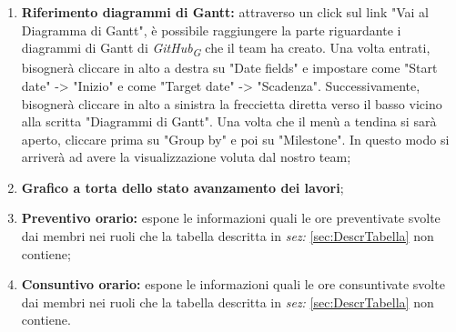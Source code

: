 \begin{enumerate}
    \item \textbf{Riferimento diagrammi di Gantt:} attraverso un click sul link "Vai al Diagramma di Gantt", è possibile raggiungere la parte riguardante i diagrammi di Gantt di \textit{GitHub}\textsubscript{\textit{G}} che il team ha creato. Una volta entrati, bisognerà cliccare in alto a destra su "Date fields" e impostare come "Start date" -> "Inizio" e come "Target date" -> "Scadenza". Successivamente, bisognerà cliccare in alto a sinistra la freccietta diretta verso il basso vicino alla scritta "Diagrammi di Gantt". Una volta che il menù a tendina si sarà aperto, cliccare prima su "Group by" e poi su "Milestone". In questo modo si arriverà ad avere la visualizzazione voluta dal nostro team;
    \item \textbf{Grafico a torta dello stato avanzamento dei lavori};
    \item \textbf{Preventivo orario:} espone le informazioni quali le ore preventivate svolte dai membri nei ruoli che la tabella descritta in \textit{sez:} \ref{sec:DescrTabella} non contiene; 
    \item \textbf{Consuntivo orario:} espone le informazioni quali le ore consuntivate svolte dai membri nei ruoli che la tabella descritta in \textit{sez:} \ref{sec:DescrTabella} non contiene. 
\end{enumerate}
